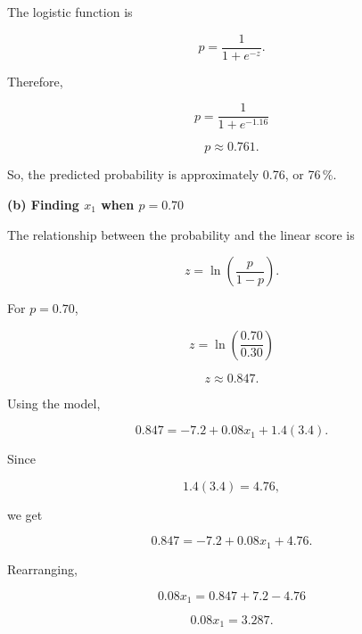 \documentclass[12pt,a4paper]{article}
\begin{document}
The logistic function is

\begin{equation*}
p=\frac{1}{1+e^{-z}}.
\end{equation*}

Therefore,

\begin{equation*}
p=\frac{1}{1+e^{-1.16}}
\end{equation*}

\begin{equation*}
p\approx0.761.
\end{equation*}

So, the predicted probability is approximately 0.76, or 76\,\%.

\textbf{(b) Finding $x_1$ when $p=0.70$}

The relationship between the probability and the linear score is

\begin{equation*}
z=\ln\left(\frac{p}{1-p}\right).
\end{equation*}

For $p=0.70$,

\begin{equation*}
z=\ln\left(\frac{0.70}{0.30}\right)
\end{equation*}

\begin{equation*}
z\approx0.847.
\end{equation*}

Using the model,

\begin{equation*}
0.847=-7.2+0.08x_1+1.4(3.4).
\end{equation*}

Since

\begin{equation*}
1.4(3.4)=4.76,
\end{equation*}

we get

\begin{equation*}
0.847=-7.2+0.08x_1+4.76.
\end{equation*}

Rearranging,

\begin{equation*}
0.08x_1=0.847+7.2-4.76
\end{equation*}

\begin{equation*}
0.08x_1=3.287.
\end{equation*}
\end{document}
